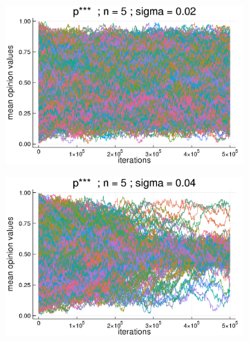 \documentclass{article}
\begin{document}
    \begin{figure}[H]
      \centering
      \begin{subfigure}[b]{0.45\textwidth}
        \includegraphics[width=\textwidth]{img/compare-ps/Poodlcalculatep***n5-rho005-sigma002-00intrans.png}
      \end{subfigure}
      \begin{subfigure}[b]{0.45\textwidth}
        \includegraphics[width=\textwidth]{img/compare-ps/Poodlcalculatep***n5-rho005-sigma004-00intrans.png}
      \end{subfigure}
      \begin{subfigure}[b]{0.5\textwidth}

\end{subfigure}
\end{figure}
\end{document}
